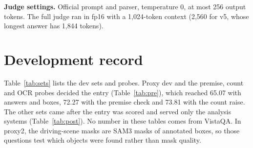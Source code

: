\documentclass{article}
\begin{document}
\textbf{Judge settings.} Official prompt and parser, temperature 0, at most 256 output tokens. The full judge ran in fp16 with a
1,024-token context (2,560 for v5, whose longest answer has 1,844 tokens).

\section{Development record}\label{app:dev}
Table~\ref{tab:sets} lists the dev sets and probes. Proxy dev and the premise, count and OCR probes decided the entry
(Table~\ref{tab:pre}), which reached 65.07 with answers and boxes, 72.27 with the premise check and 73.81 with the count raise. The
other sets came after the entry was scored and served only the analysis systems (Table~\ref{tab:post}). No number in these tables
comes from VistaQA. In proxy2, the driving-scene masks are SAM3 masks of annotated boxes, so those questions test which objects were
found rather than mask quality.
\end{document}
